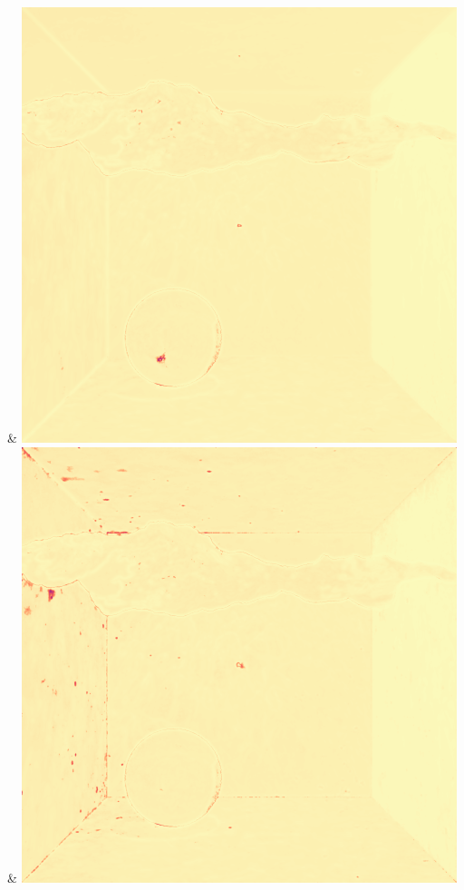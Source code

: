 & \includegraphics[width=\linewidth]{figures/py/tests/quality_comparison/nrc+lt+bal_1spp_caustics_small_flip.png}
& \includegraphics[width=\linewidth]{figures/py/tests/quality_comparison/nrc+lt+balcam_1spp_caustics_small_flip.png}
